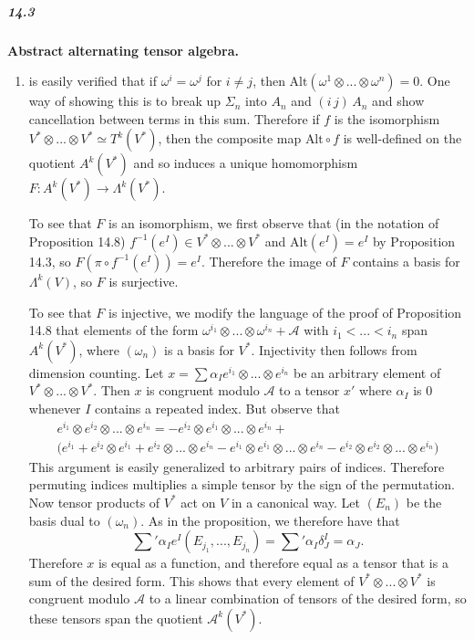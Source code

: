 \documentclass[10pt,letter]{article}
\begin{document}
\subparagraph*{14.3} {\bf Abstract alternating tensor algebra.} 
\begin{enumerate}
\item is easily verified that if $\omega^i = \omega^j$ for $i \neq j$, then $\text{Alt}(\omega^1 \otimes ... \otimes \omega^n) = 0$. One way of showing this is to break up $\Sigma_n$ into $A_n$ and $(i\, j) \, A_n$ and show cancellation between terms in this sum. Therefore if $f$ is the isomorphism $V^{\ast} \otimes ... \otimes V^{\ast} \simeq T^k(V^{\ast})$, then the composite map $\text{Alt} \circ f$ is well-defined on the quotient $A^k(V^{\ast})$ and so induces a unique homomorphism $F: A^k(V^{\ast}) \rightarrow \Lambda^k(V^{\ast})$. 

To see that $F$ is an isomorphism, we first observe that (in the notation of Proposition 14.8) $f^{-1}(e^I) \in V^{\ast} \otimes ... \otimes V^{\ast}$ and $\text{Alt}(e^I) = e^I$ by Proposition 14.3, so $F ( \pi \circ f^{-1}(e^I)) = e^I$. Therefore the image of $F$ contains a basis for $\Lambda^k(V)$, so $F$ is surjective. 

To see that $F$ is injective, we modify the language of the proof of Proposition 14.8 that elements of the form $\omega^{i_1} \otimes ... \otimes \omega^{i_n} + \mathcal{A}$ with $i_1 < ... < i_n$ span $A^k(V^{\ast})$, where $(\omega_n)$ is a basis for $V^{\ast}$. Injectivity then follows from dimension counting. Let $x = \sum \alpha_I e^{i_1} \otimes ... \otimes e^{i_n}$ be an arbitrary element of $V^{\ast} \otimes ... \otimes V^{\ast}$. Then $x$ is congruent modulo $\mathcal{A}$ to a tensor $x'$ where $\alpha_I$ is $0$ whenever $I$ contains a repeated index. But observe that 
\begin{multline} 
e^{i_1} \otimes e^{i_2} \otimes ... \otimes e^{i_n} = -e^{i_2} \otimes e^{i_1} \otimes ... \otimes e^{i_n} + \\ \bigg( e^{i_1}+e^{i_2} \otimes e^{i_1}+e^{i_2} \otimes ... \otimes e^{i_n} - e^{i_1} \otimes e^{i_1} \otimes ... \otimes e^{i_n}  - e^{i_2} \otimes e^{i_2} \otimes ... \otimes e^{i_n}\bigg) 
\end{multline}
This argument is easily generalized to arbitrary pairs of indices. Therefore permuting indices multiplies a simple tensor by the sign of the permutation. Now tensor products of $V^{\ast}$ act on $V$ in a canonical way. Let $(E_n)$ be the basis dual to $(\omega_n)$. As in the proposition, we therefore have that \[ \sum' \alpha_I e^I(E_{j_1},...,E_{j_n}) =  \sum' \alpha_I \delta^I_J = \alpha_J. \] Therefore $x$ is equal as a function, and therefore equal as a tensor that is a sum of the desired form.  This shows that every element of $V^{\ast} \otimes ... \otimes V^{\ast}$ is congruent modulo $\mathcal{A}$ to a linear combination of tensors of the desired form, so these tensors span the quotient $\mathcal{A}^k(V^{\ast})$. 


\end{enumerate}
\end{document}
